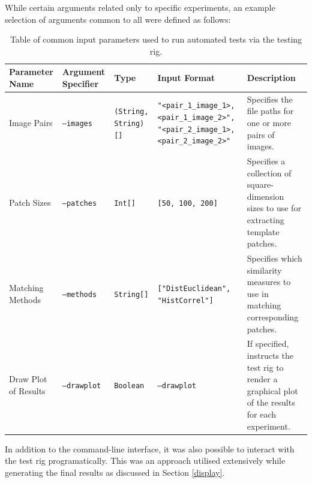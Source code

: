 While certain arguments related only to specific experiments, an example selection of arguments common to all were defined as follows:

\begin{table}[h]
\small
\begin{tabular}{|p{2cm}|p{2cm}|p{2cm}|p{3.5cm}|p{3.5cm}|}
\hline
Parameter Name & Argument Specifier & Type  & Input Format & Description \\ \hline
Image Pairs & \texttt{--images} & \texttt{(String, String)[]} & \texttt{"\textless pair\_1\_image\_1\textgreater, \textless pair\_1\_image\_2\textgreater", "\textless pair\_2\_image\_1\textgreater, \textless pair\_2\_image\_2\textgreater"} & Specifies the file paths for one or more pairs of images. \\ \hline
Patch Sizes & \texttt{--patches} & \texttt{Int[]} & \texttt{[50, 100, 200]} & Specifies a collection of square-dimension sizes to use for extracting template patches. \\ \hline  
Matching Methods & \texttt{--methods} & \texttt{String[]} & \texttt{["DistEuclidean", "HistCorrel"]} & Specifies which similarity measures to use in matching corresponding patches. \\ \hline   
Draw Plot of Results & \texttt{--drawplot} & \texttt{Boolean} & \texttt{--drawplot} & If specified, instructs the test rig to render a graphical plot of the results for each experiment. \\ \hline  
\end{tabular}
\caption {Table of common input parameters used to run automated tests via the testing rig.}
\end{table}

In addition to the command-line interface, it was also possible to interact with the test rig programatically. This was an approach utilised extensively while generating the final results as discussed in Section \ref{display}.

%


